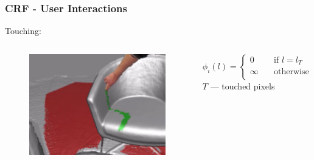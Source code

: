 \documentclass[mathserif, 10pt]{beamer}
\begin{document}
\begin{frame}
\frametitle{CRF - User Interactions}
  Touching:
  \begin{columns}
   \begin{column}{0.25\textwidth}
    \begin{figure}
    \includegraphics[width=\textwidth]{figures/touch}
    \end{figure}
    \end{column}
    \begin{column}{0.75\textwidth}
      \begin{equation}
	\phi_i(l) =
	  \begin{cases}
	    0      & \quad \text{if } l = l_T\\
	    \infty  & \quad \text{otherwise}\\
	  \end{cases}
      \end{equation}
      \center
      $T$ --- touched pixels
   \end{column}

  \end{columns}
  

\end{frame}
\end{document}
